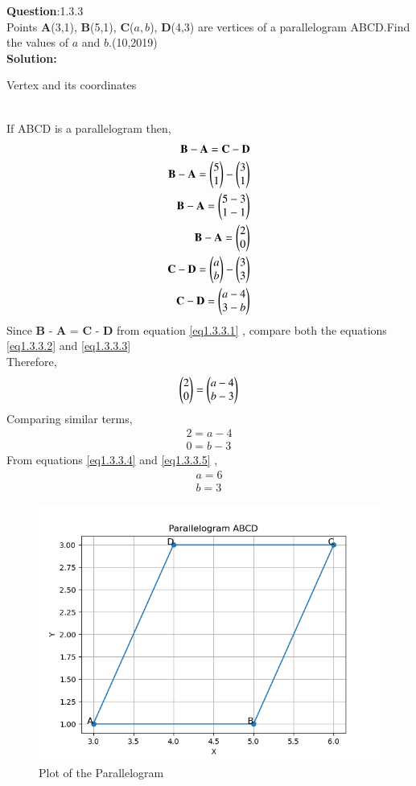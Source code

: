 \documentclass[journal]{IEEEtran}
\begin{document}
\textbf{Question}:1.3.3\\
Points \textbf{A}(3,1), \textbf{B}(5,1), \textbf{C}($a,b$), \textbf{D}(4,3) are vertices of a parallelogram ABCD.Find the values of $a$ and $b$.\hfill(10,2019)
\\
\textbf{Solution:}
\renewcommand{\tablename}{Table 1.3.3.1}
\begin{table}[h!]
  \centering
  
  \caption{Vertex and its coordinates}
\end{table}\\
 If ABCD is a parallelogram then,
 \begin{align}
     \textbf{B} - \textbf{A} = \textbf{C} - \textbf{D} \label{eq1.3.3.1} \\
     \textbf{B} - \textbf{A} = \begin{pmatrix}5 \\ 1\end{pmatrix} - \begin{pmatrix}3 \\ 1\end{pmatrix} \\
     \textbf{B} - \textbf{A} = \begin{pmatrix}5 - 3 \\ 1 - 1\end{pmatrix}\\
     \textbf{B} - \textbf{A} = \begin{pmatrix}2 \\ 0\end{pmatrix} \label{eq1.3.3.2} \\
	 \textbf{C} - \textbf{D} = \begin{pmatrix}a \\ b\end{pmatrix} - \begin{pmatrix}3 \\ 3\end{pmatrix} \\
     \textbf{C} - \textbf{D} = \begin{pmatrix}a - 4 \\ 3 - b\end{pmatrix} \label{eq1.3.3.3} \\
     \end{align}
Since  \textbf{B} - \textbf{A} = \textbf{C} - \textbf{D} from equation \ref{eq1.3.3.1} , compare both the equations \ref{eq1.3.3.2} and \ref{eq1.3.3.3} \\
Therefore,
\begin{align}
    \begin{pmatrix}2 \\ 0\end{pmatrix} = \begin{pmatrix}a - 4 \\ b - 3\end{pmatrix} \\
\end{align}
Comparing similar terms,
\begin{align}
    2 = a - 4 \label{eq1.3.3.4} \\
    0 = b - 3 \label{eq1.3.3.5}
\end{align}
From equations \ref{eq1.3.3.4} and \ref{eq1.3.3.5} , \\
\begin{align}
    a = 6 \\
    b = 3
    \end{align}
    \begin{figure}[h!]
	    \centering
	    \includegraphics[width=0.7\linewidth]{figs/pgm.png}
	    \caption{Plot of the Parallelogram}
    \end{figure}
    
\end{document}
